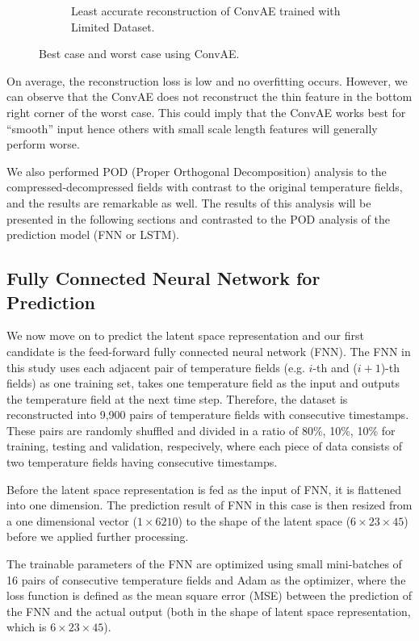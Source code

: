 \begin{figure}[H]
\begin{subfigure}{0.45\textwidth}
    \caption{Least accurate reconstruction of ConvAE trained with Limited Dataset.}
\end{subfigure}     
\caption{Best case and worst case using ConvAE.}
\label{figure:ConvAE_limited_best_worst}
\end{figure}


On average, the reconstruction loss is low and no overfitting occurs. However, we can observe that the ConvAE does not reconstruct the thin feature in the bottom right corner of the worst case. This could imply that the ConvAE works best for ``smooth'' input hence others with small scale length features will generally perform worse.

We also performed POD (Proper Orthogonal Decomposition) analysis to the compressed-decompressed fields with contrast to the original temperature fields, and the results are remarkable as well. The results of this analysis will be presented in the following sections and contrasted to the POD analysis of the prediction model (FNN or LSTM).


\subsection{Fully Connected Neural Network for Prediction}

We now move on to predict the latent space representation and our first candidate is the feed-forward fully connected neural network (FNN). The FNN in this study uses each adjacent pair of temperature fields (e.g. $i$-th and ($i+1$)-th fields) as one training set, takes one temperature field as the input and outputs the temperature field at the next time step. Therefore, the dataset is reconstructed into 9,900 pairs of temperature fields with consecutive timestamps. These pairs are randomly shuffled and divided in a ratio of 80\%, 10\%, 10\% for training, testing and validation, respecively, where each piece of data consists of two temperature fields having consecutive timestamps.

Before the latent space representation is fed as the input of FNN, it is flattened into one dimension. The prediction result of FNN in this case is then resized from a one dimensional vector ($1 \times 6210$) to the shape of the latent space ($6 \times 23 \times 45$) before we applied further processing.

The trainable parameters of the FNN are optimized using small mini-batches of 16 pairs of consecutive temperature fields and Adam as the optimizer, where the loss function is defined as the mean square error (MSE) between the prediction of the FNN and the actual output (both in the shape of latent space representation, which is $6 \times 23 \times 45$).

